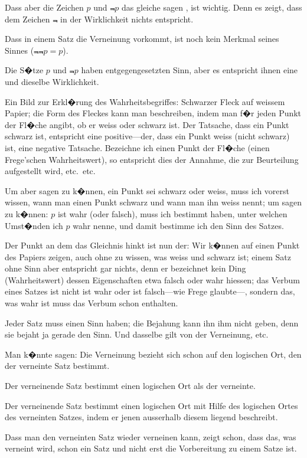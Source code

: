 {Dass aber die Zeichen \glqq{}$p$\grqq{} und \glqq{}$\Not{p}$\grqq{} das gleiche
sagen , ist wichtig. Denn es zeigt, dass
dem Zeichen \glqq{}$\Not{}$\grqq{} in der Wirklichkeit nichts
entspricht.

Dass in einem Satz die Verneinung vorkommt,
ist noch kein Merkmal seines Sinnes ($\Not{\Not{p}} = p$).

Die S�tze \glqq{}$p$\grqq{} und \glqq{}$\Not{p}$\grqq{} haben entgegengesetzten
Sinn, aber es entspricht ihnen eine und
dieselbe Wirklichkeit.}


{Ein Bild zur Erkl�rung des Wahrheitsbegriffes:
Schwarzer Fleck auf weissem Papier; die Form
des Fleckes kann man beschreiben, indem man
f�r jeden Punkt der Fl�che angibt, ob er weiss
oder schwarz ist. Der Tatsache, dass ein Punkt
schwarz ist, entspricht eine positive---der, dass
ein Punkt weiss (nicht schwarz) ist, eine negative
Tatsache. Bezeichne ich einen Punkt der Fl�che
(einen Frege'schen Wahrheitswert), so entspricht
dies der Annahme, die zur Beurteilung aufgestellt
wird, etc.\ etc.

Um aber sagen zu k�nnen, ein Punkt sei
schwarz oder weiss, muss ich vorerst wissen,
wann man einen Punkt schwarz und wann
man ihn weiss nennt; um sagen zu k�nnen:
\glqq{}$p$\grqq{} ist wahr (oder falsch), muss ich bestimmt
haben, unter welchen Umst�nden ich \glqq{}$p$\grqq{} wahr
nenne, und damit bestimme ich den Sinn des
Satzes.

Der Punkt an dem das Gleichnis hinkt ist
nun der: Wir k�nnen auf einen Punkt des Papiers
zeigen, auch ohne zu wissen, was weiss und
schwarz ist; einem Satz ohne Sinn aber entspricht
gar nichts, denn er bezeichnet kein Ding (Wahrheitswert)
dessen Eigenschaften etwa \glqq{}falsch\grqq{} oder
\glqq{}wahr\grqq{} hiessen; das Verbum eines Satzes ist nicht
\glqq{}ist wahr\grqq{} oder \glqq{}ist falsch\grqq{}---wie Frege glaubte---,
sondern das, was \glqq{}wahr ist\grqq{} muss das Verbum
schon enthalten.}


{Jeder Satz muss  einen Sinn haben;
die Bejahung kann ihn ihm nicht geben, denn
sie bejaht ja gerade den Sinn. Und dasselbe gilt
von der Verneinung, etc.}


{Man k�nnte sagen: Die Verneinung bezieht
sich schon auf den logischen Ort, den der verneinte
Satz bestimmt.

Der verneinende Satz bestimmt einen 
logischen Ort als der verneinte.

Der verneinende Satz bestimmt einen logischen
Ort mit Hilfe des logischen Ortes des verneinten
Satzes, indem er jenen ausserhalb diesem liegend
beschreibt.

Dass man den verneinten Satz wieder verneinen
kann, zeigt schon, dass das, was verneint wird,
schon ein Satz und nicht erst die Vorbereitung
zu einem Satze ist.}


